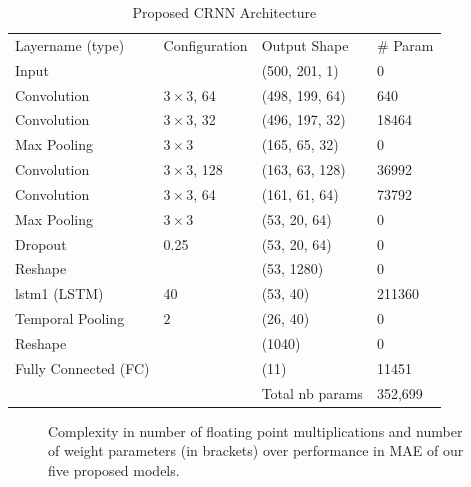 
\begin{table}
  \caption{Proposed CRNN Architecture}%
  \label{fig:crnndetail}
  \centering
\begin{tabular}{llll}
  \toprule
  Layername (type)              & Configuration    & Output Shape    & \# Param\\
  Input                         &                  &  (500, 201, 1)  & 0 \\
  Convolution                   & $3\times 3$, 64  &  (498, 199, 64) & 640 \\
  Convolution                   & $3\times 3$, 32  &  (496, 197, 32) & 18464 \\
  Max Pooling                   & $3\times 3$      &  (165, 65, 32)  & 0 \\
  Convolution                   & $3\times 3$, 128 &  (163, 63, 128) & 36992 \\
  Convolution                   & $3\times 3$, 64  &  (161, 61, 64)  & 73792 \\
  Max Pooling                   & $3\times 3$      &  (53, 20, 64)   & 0 \\
  Dropout                       & 0.25             &  (53, 20, 64)   & 0 \\
  Reshape                       &                  &  (53, 1280)     & 0 \\
  lstm1 (LSTM)                  & 40               &  (53, 40)       & 211360 \\
  Temporal Pooling              & $2$              &  (26, 40)       & 0 \\
  Reshape                       &                  &  (1040)         & 0 \\
  Fully Connected (FC)          &                  &  (11)            & 11451 \\
  \midrule
  & & Total nb params & 352,699 \\
  \bottomrule
  \end{tabular}
\end{table}

\begin{figure}[t]
  \centering
    \begin{adjustbox}{width=0.66\columnwidth}
      
    \end{adjustbox}
    \caption{Complexity in number of floating point multiplications and number of weight parameters (in brackets) over performance in MAE of our five proposed models.}%
  \label{fig:complexity}
\end{figure}

